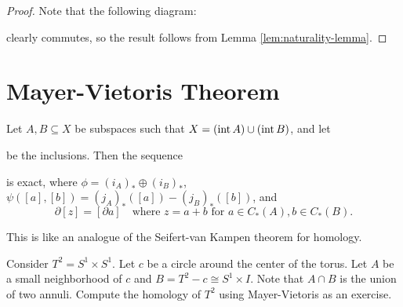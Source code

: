 \begin{proof}
  Note that the following diagram:
  \begin{center}
  \end{center}
  clearly commutes, so the result follows from
  Lemma \ref{lem:naturality-lemma}.
\end{proof}

\section{Mayer-Vietoris Theorem}

\begin{theorem}
  Let $A, B \subseteq X$ be subspaces such that
  $X = (\operatorname{int} A) \cup (\operatorname{int} B)$, and let
  \begin{center}
  \end{center}
  be the inclusions. Then the sequence
  \begin{center}
  \end{center}
  is exact, where $\phi = (i_A)_* \oplus (i_B)_*$,
  $\psi([a], [b]) = (j_A)_*([a]) - (j_B)_*([b])$, and
  \[
    \partial [z] = [\partial a]
    \quad \text{where } z = a + b \text{ for } a \in C_*(A), b \in C_*(B).
  \]
\end{theorem}

\begin{remark}
  This is like an analogue of the Seifert-van Kampen
  theorem for homology.
\end{remark}

\begin{example}
  Consider $T^2 = S^1 \times S^1$. Let $c$ be a
  circle around the center of the torus. Let
  $A$ be a small neighborhood of $c$ and
  $B = T^2 - c \cong S^1 \times I$. Note that
  $A \cap B$ is the union of two annuli.
  Compute the homology of $T^2$ using Mayer-Vietoris
  as an exercise.
\end{example}
